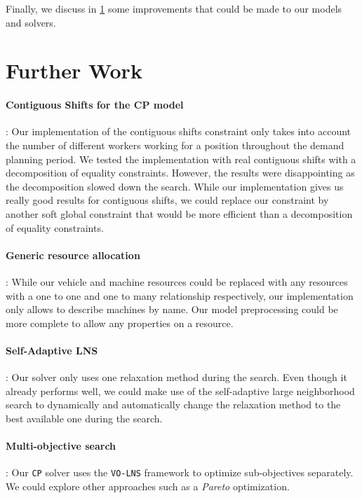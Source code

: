 \documentclass[../thesis.tex]{subfiles}
\begin{document}
Finally, we discuss in \ref{further-work} some improvements that could be made to our models and solvers.

\section{Further Work}
\label{further-work}

\paragraph{Contiguous Shifts for the CP model}: Our implementation of the contiguous shifts constraint only takes into account 
the number of different workers working for a position throughout the demand planning period.
We tested the implementation with real contiguous shifts with a decomposition of equality constraints. However, the results 
were disappointing as the decomposition slowed down the search. While our implementation gives us really good results for contiguous shifts,
we could replace our constraint by another soft global constraint that would be more efficient than 
a decomposition of equality constraints.

\paragraph{Generic resource allocation}: While our vehicle and machine resources could be replaced with 
any resources with a one to one and one to many relationship respectively, our implementation only allows to describe
machines by name. Our model preprocessing could be more complete to allow any properties on a resource.

\paragraph{Self-Adaptive LNS}: Our solver only uses one relaxation method during the search. 
Even though it already performs well, we could make 
use of the self-adaptive large neighborhood search \cite{thomas:adaptive} to dynamically 
and automatically change the relaxation method to the best available one during the search.

\paragraph{Multi-objective search}: Our \texttt{CP} solver uses the \texttt{VO-LNS} framework to optimize sub-objectives separately.
We could explore other approaches such as a \emph{Pareto} optimization.  
\end{document}
